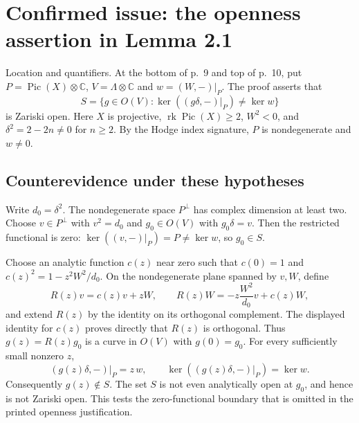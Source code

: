 \documentclass[10pt]{article}
\begin{document}
\section*{Confirmed issue: the openness assertion in Lemma 2.1}
Location and quantifiers. At the bottom of p. 9 and top of p. 10, put \(P=\operatorname{Pic}(X)\otimes\mathbb C\), \(V=\Lambda\otimes\mathbb C\) and \(w=(W,-)|_P\). The proof asserts that \[S=\{g\in O(V):\ker((g\delta,-)|_P)\ne\ker w\}\] is Zariski open. Here \(X\) is projective, \(\operatorname{rk}\operatorname{Pic}(X)\ge2\), \(W^2<0\), and \(\delta^2=2-2n\ne0\) for \(n\ge2\). By the Hodge index signature, \(P\) is nondegenerate and \(w\ne0\).\par
\subsection*{Counterevidence under these hypotheses}
Write \(d_0=\delta^2\). The nondegenerate space \(P^\perp\) has complex dimension at least two. Choose \(v\in P^\perp\) with \(v^2=d_0\) and \(g_0\in O(V)\) with \(g_0\delta=v\). Then the restricted functional is zero: \(\ker((v,-)|_P)=P\ne\ker w\), so \(g_0\in S\).\par
Choose an analytic function \(c(z)\) near zero such that \(c(0)=1\) and \(c(z)^2=1-z^2W^2/d_0\). On the nondegenerate plane spanned by \(v,W\), define \[R(z)v=c(z)v+zW,\qquad
 R(z)W=-z\frac{W^2}{d_0}v+c(z)W,\] and extend \(R(z)\) by the identity on its orthogonal complement. The displayed identity for \(c(z)\) proves directly that \(R(z)\) is orthogonal. Thus \(g(z)=R(z)g_0\) is a curve in \(O(V)\) with \(g(0)=g_0\). For every sufficiently small nonzero \(z\), \[(g(z)\delta,-)|_P=z\,w,\qquad
 \ker((g(z)\delta,-)|_P)=\ker w.\] Consequently \(g(z)\notin S\). The set \(S\) is not even analytically open at \(g_0\), and hence is not Zariski open. This tests the zero-functional boundary that is omitted in the printed openness justification.\par
\end{document}
